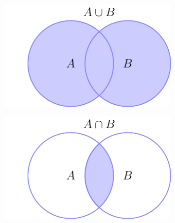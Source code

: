 \begin{figure}[t]
\centering
    \begin{subfigure}[t]{0.45\textwidth}
    \includegraphics[width=\textwidth]{figures/math/set_theory/set_venn_or.pdf}
    \end{subfigure}
    \begin{subfigure}[t]{0.45\textwidth}
    \includegraphics[width=\textwidth]{figures/math/set_theory/set_venn_and.pdf}
    \end{subfigure}


\end{figure}
